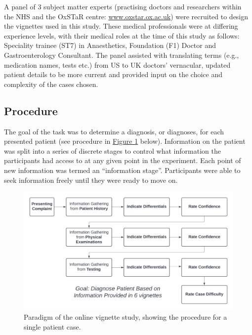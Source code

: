 \documentclass[a4paper, nobind]{templates/ociamthesis}
\begin{document}
A panel of 3 subject matter experts (practising doctors and researchers within the NHS and the OxSTaR centre: \url{www.oxstar.ox.ac.uk}) were recruited to design the vignettes used in this study. These medical professionals were at differing experience levels, with their medical roles at the time of this study as follows: Speciality trainee (ST7) in Anaesthetics, Foundation (F1) Doctor and Gastroenterology Consultant. The panel assisted with translating terms (e.g., medication names, tests etc.) from US to UK doctors' vernacular, updated patient details to be more current and provided input on the choice and complexity of the cases chosen.

\subsection{Procedure}\label{procedure}

The goal of the task was to determine a diagnosis, or diagnoses, for each presented patient (see procedure in \hyperref[fig:paradigm]{Figure \ref{fig:paradigm}} below). Information on the patient was split into a series of discrete stages to control what information the participants had access to at any given point in the experiment. Each point of new information was termed an ``information stage''. Participants were able to seek information freely until they were ready to move on.\\

\begin{figure}[H]

{\centering \includegraphics[width=1\linewidth]{./assets/Paradigm} 

}

\caption[Online Study: Paradigm]{Paradigm of the online vignette study, showing the procedure for a single patient case.}\label{fig:paradigm}
\end{figure}
\end{document}
